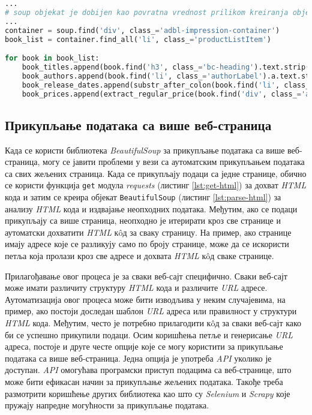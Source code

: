 \documentclass[12pt,oneside]{memoir}
\begin{document}
\begin{lstlisting}[language=Python, caption={
Издвајање наслова, аутора, датума издања и цене књиге из \textit{HTML} кода веб-странице}, label={lst:parse-html-books}]
...
# soup objekat je dobijen kao povratna vrednost prilikom kreiranja objekta tipa BeautifulSoup
...
container = soup.find('div', class_='adbl-impression-container')
book_list = container.find_all('li', class_='productListItem')

for book in book_list:
    book_titles.append(book.find('h3', class_='bc-heading').text.strip())
    book_authors.append(book.find('li', class_='authorLabel').a.text.strip())
    book_release_dates.append(substr_after_colon(book.find('li', class_='releaseDateLabel').text.strip()))
    book_prices.append(extract_regular_price(book.find('div', class_='adblBuyBoxPrice').text.strip()))
\end{lstlisting}

\subsection{Прикупљање података са више веб-страница} 
Када се користи библиотека \textit{BeautifulSoup} за прикупљање података са више веб-страница, могу се јавити проблеми у вези са аутоматским прикупљањем података са свих жељених страница. Када се прикупљају подаци са једне странице, обично се користи функција \texttt{get} модула \textit{requests} (листинг \ref{lst:get-html}) за дохват \textit{HTML} кода и затим се креира објекат \texttt{BeautifulSoup} (листинг \ref{lst:parse-html}) за анализу \textit{HTML} кода и издвајање неопходних података. Међутим, ако се подаци прикупљају са више страница, неопходно је итерирати кроз све странице и аутоматски дохватити \textit{HTML} кôд за сваку страницу. На пример, ако странице имају адресе које се разликују само по броју странице, може да се искористи петља која пролази кроз све адресе и дохвата \textit{HTML} кôд сваке странице.

Прилагођавање овог процеса је за сваки веб-сајт специфично. Сваки веб-сајт може имати различиту структуру \textit{HTML} кода и различите \textit{URL} адресе. Аутоматизација овог процеса може бити изводљива у неким случајевима, на пример, ако постоји доследан шаблон \textit{URL} адреса или правилност у структури \textit{HTML} кода. Међутим, често је потребно прилагодити кôд за сваки веб-сајт како би се успешно прикупили подаци. Осим коришћења петље и генерисање \textit{URL} адреса, постоје и друге честе опције које се могу користити за прикупљање података са више веб-страница. Једна опција је употреба \textit{API} уколико је доступан. \textit{API} омогућава програмски приступ подацима са веб-странице, што може бити ефикасан начин за прикупљање жељених података. Такође треба размотрити коришћење других библиотека као што су \textit{Selenium} и \textit{Scrapy} које пружају напредне могућности за прикупљање података.
\end{document}
